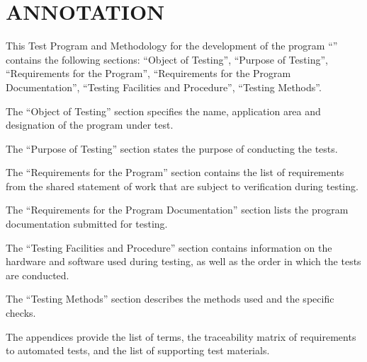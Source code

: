 \documentclass[12pt,a4paper]{extarticle}
\begin{document}
\sloppy





\section*{ANNOTATION}

This Test Program and Methodology for the development of the program \enquote{\hseProjectName} contains the following sections: \enquote{Object of Testing}, \enquote{Purpose of Testing}, \enquote{Requirements for the Program}, \enquote{Requirements for the Program Documentation}, \enquote{Testing Facilities and Procedure}, \enquote{Testing Methods}.

The \enquote{Object of Testing} section specifies the name, application area and designation of the program under test.

The \enquote{Purpose of Testing} section states the purpose of conducting the tests.

The \enquote{Requirements for the Program} section contains the list of requirements from the shared statement of work that are subject to verification during testing.

The \enquote{Requirements for the Program Documentation} section lists the program documentation submitted for testing.

The \enquote{Testing Facilities and Procedure} section contains information on the hardware and software used during testing, as well as the order in which the tests are conducted.

The \enquote{Testing Methods} section describes the methods used and the specific checks.

The appendices provide the list of terms, the traceability matrix of requirements to automated tests, and the list of supporting test materials.

\clearpage
\end{document}
